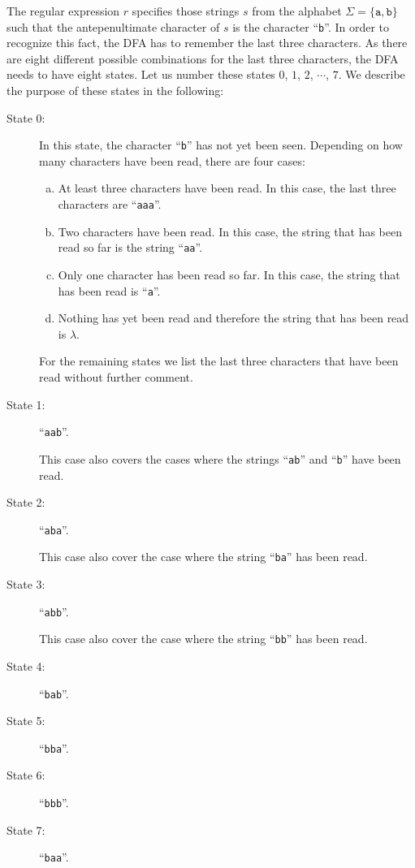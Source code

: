 \solutionEng
The regular expression $r$ specifies those strings $s$ from the alphabet 
$\Sigma = \{ \mathtt{a}, \mathtt{b} \}$ such that the antepenultimate character of $s$ is the
character ``\texttt{b}''.  In order to recognize this fact, the \textsc{DFA} has to remember the
last three characters.  As there are eight different possible combinations for the last three
characters, the \textsc{DFA} needs to have eight states.  Let us number these states 
 $0$, $1$, $2$, $\cdots$, $7$.  We describe the purpose of these states in the following:
\begin{description}
\item[State 0:] In this state, the character ``\texttt{b}'' has not yet been seen. 
  Depending on how many characters have been read, there are four cases:
  \begin{enumerate}[(a)]
  \item At least three characters have been read.  In this case, the last three characters are ``\texttt{aaa}''.  
  \item Two characters have been read.  In this case, the string that has been read so far is the string ``\texttt{aa}''.  
  \item Only one character has been read so far. In this case, the string that has been read is ``\texttt{a}''.  
  \item Nothing has yet been read and therefore the string that has been read is $\lambda$.
  \end{enumerate}

                For the remaining states we list the last three characters  that have been read
                without further comment.
\item[State 1:] ``\texttt{aab}''.

                This case also covers the cases where the strings ``\texttt{ab}'' and ``\texttt{b}''
                have been read.
\item[State 2:] ``\texttt{aba}''.

                This case also cover the case where the string ``\texttt{ba}'' 
                has been read.
\item[State 3:] ``\texttt{abb}''.

                This case also cover the case where the string ``\texttt{bb}'' 
                has been read.
\item[State 4:] ``\texttt{bab}''.
\item[State 5:] ``\texttt{bba}''.
\item[State 6:] ``\texttt{bbb}''.
\item[State 7:] ``\texttt{baa}''.
\end{description}
